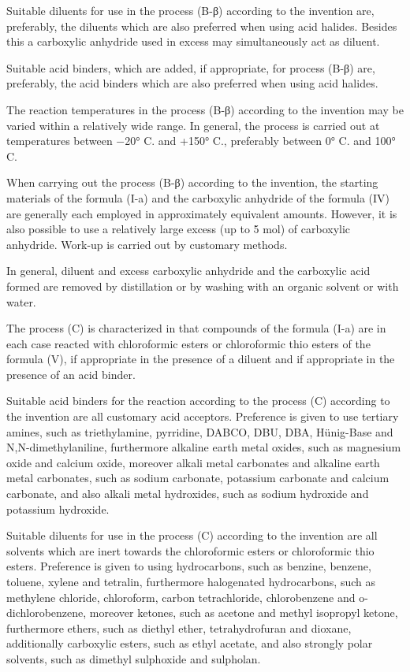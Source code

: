 \documentclass[11pt,a4paper]{article}
\begin{document}
Suitable diluents for use in the process (B-β) according to the invention are, preferably, the diluents which are also preferred when using acid halides. Besides this a carboxylic anhydride used in excess may simultaneously act as diluent.

Suitable acid binders, which are added, if appropriate, for process (B-β) are, preferably, the acid binders which are also preferred when using acid halides.

The reaction temperatures in the process (B-β) according to the invention may be varied within a relatively wide range. In general, the process is carried out at temperatures between −20° C. and +150° C., preferably between 0° C. and 100° C.

When carrying out the process (B-β) according to the invention, the starting materials of the formula (I-a) and the carboxylic anhydride of the formula (IV) are generally each employed in approximately equivalent amounts. However, it is also possible to use a relatively large excess (up to 5 mol) of carboxylic anhydride. Work-up is carried out by customary methods.

In general, diluent and excess carboxylic anhydride and the carboxylic acid formed are removed by distillation or by washing with an organic solvent or with water.

The process (C) is characterized in that compounds of the formula (I-a) are in each case reacted with chloroformic esters or chloroformic thio esters of the formula (V), if appropriate in the presence of a diluent and if appropriate in the presence of an acid binder.

Suitable acid binders for the reaction according to the process (C) according to the invention are all customary acid acceptors. Preference is given to use tertiary amines, such as triethylamine, pyrridine, DABCO, DBU, DBA, Hünig-Base and N,N-dimethylaniline, furthermore alkaline earth metal oxides, such as magnesium oxide and calcium oxide, moreover alkali metal carbonates and alkaline earth metal carbonates, such as sodium carbonate, potassium carbonate and calcium carbonate, and also alkali metal hydroxides, such as sodium hydroxide and potassium hydroxide.

Suitable diluents for use in the process (C) according to the invention are all solvents which are inert towards the chloroformic esters or chloroformic thio esters. Preference is given to using hydrocarbons, such as benzine, benzene, toluene, xylene and tetralin, furthermore halogenated hydrocarbons, such as methylene chloride, chloroform, carbon tetrachloride, chlorobenzene and o-dichlorobenzene, moreover ketones, such as acetone and methyl isopropyl ketone, furthermore ethers, such as diethyl ether, tetrahydrofuran and dioxane, additionally carboxylic esters, such as ethyl acetate, and also strongly polar solvents, such as dimethyl sulphoxide and sulpholan.
\end{document}
